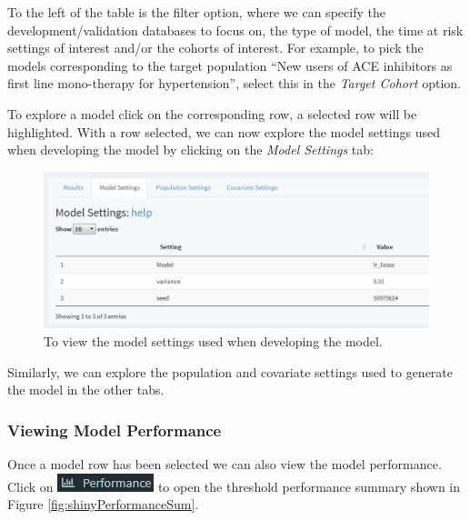 \documentclass[11pt]{book}
\theoremstyle{definition}
\theoremstyle{definition}
\theoremstyle{definition}
\theoremstyle{remark}
\begin{document}
To the left of the table is the filter option, where we can specify the
development/validation databases to focus on, the type of model, the
time at risk settings of interest and/or the cohorts of interest. For
example, to pick the models corresponding to the target population ``New
users of ACE inhibitors as first line mono-therapy for hypertension'',
select this in the \emph{Target Cohort} option.

To explore a model click on the corresponding row, a selected row will
be highlighted. With a row selected, we can now explore the model
settings used when developing the model by clicking on the \emph{Model
Settings} tab:

\begin{figure}

{\centering \includegraphics[width=1\linewidth]{images/PatientLevelPrediction/shiny/shinyModel} 

}

\caption{To view the model settings used when developing the model.}\label{fig:shinyModel}
\end{figure}

Similarly, we can explore the population and covariate settings used to
generate the model in the other tabs.

\subsubsection*{Viewing Model
Performance}\label{viewing-model-performance}

Once a model row has been selected we can also view the model
performance. Click on
\includegraphics{images/PatientLevelPrediction/performance.png} to open
the threshold performance summary shown in Figure
\ref{fig:shinyPerformanceSum}.
\end{document}
